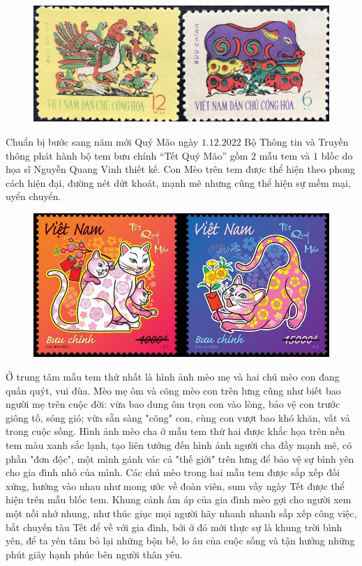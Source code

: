 \begin{multicols}{2}
	\begin{figure}[H]
		\vspace*{-5pt}
		\centering
		\captionsetup{labelformat= empty, justification=centering}
		\includegraphics[width= 1\linewidth]{tem1}
		\vspace*{-15pt}
	\end{figure}
	Chuẩn bị bước sang năm mới Quý Mão ngày $1.12.2022$  Bộ Thông tin và Truyền thông phát hành bộ tem bưu chính “Tết Quý Mão” gồm $2$ mẫu tem và $1$ blốc do họa sĩ Nguyễn Quang Vinh thiết kế. Con Mèo trên tem được thể hiện theo phong cách hiện đại, đường nét dứt khoát, mạnh mẽ nhưng cũng thể hiện sự mềm mại, uyển chuyển. 
	\begin{figure}[H]
		\vspace*{-5pt}
		\centering
		\captionsetup{labelformat= empty, justification=centering}
		\includegraphics[width= 1\linewidth]{tem2}
		\vspace*{-15pt}
	\end{figure}
	Ở trung tâm mẫu tem thứ nhất là hình ảnh mèo mẹ và hai chú mèo con đang quấn quýt, vui đùa. Mèo mẹ ôm và cõng mèo con trên lưng cũng như biết bao người mẹ trên cuộc đời: vừa bao dung ôm trọn con vào lòng, bảo vệ con trước giông tố, sóng gió; vừa sẵn sàng "cõng" con, cùng con vượt bao khó khăn, vất vả trong cuộc sống. Hình ảnh mèo cha ở mẫu tem thứ hai được khắc họa trên nền tem màu xanh sắc lạnh, tạo liên tưởng đến hình ảnh người cha đầy mạnh mẽ, có phần "đơn độc", một mình gánh vác cả "thế giới" trên lưng để bảo vệ sự bình yên cho gia đình nhỏ của mình. Các chú mèo trong hai mẫu tem được sắp xếp đối xứng, hướng vào nhau như mong ước về đoàn viên, sum vầy ngày Tết được thể hiện trên mẫu blốc tem. Khung cảnh ấm áp của gia đình mèo gợi cho người xem một nỗi nhớ nhung, như thúc giục mọi người hãy nhanh nhanh sắp xếp công việc, bắt chuyến tàu Tết để về với gia đình, bởi ở đó mới thực sự là khung trời bình yên, để ta yên tâm bỏ lại những bộn bề, lo âu của cuộc sống và tận hưởng những phút giây hạnh phúc bên người thân yêu.

\end{multicols}
